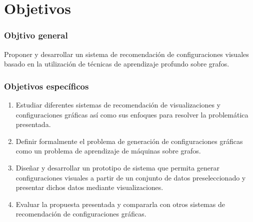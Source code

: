 \section*{Objetivos}

\subsubsection{Objtivo general}
Proponer y desarrollar un sistema de recomendaci\'on de configuraciones
visuales basado en la utilizaci\'on de t\'ecnicas de aprendizaje profundo
sobre grafos.

\subsubsection{Objetivos espec\'ificos}
\begin{enumerate}
   \item Estudiar diferentes sistemas de recomendaci\'on de visualizaciones y configuraciones
   gr\'aficas as\'i como sus enfoques para resolver la problem\'atica presentada.
    
    \item Definir formalmente el problema de generaci\'on de configuraciones
    gr\'aficas como un problema de aprendizaje de m\'aquinas sobre grafos.

    \item Dise\~nar y desarrollar un prototipo de sistema que permita generar configuraciones
    visuales a partir de un conjunto de datos preseleccionado y presentar dichos datos
    mediante visualizaciones.

    \item Evaluar la propuesta presentada y compararla con otros sistemas de
    recomendaci\'on de configuraciones gr\'aficas.

\end{enumerate}



